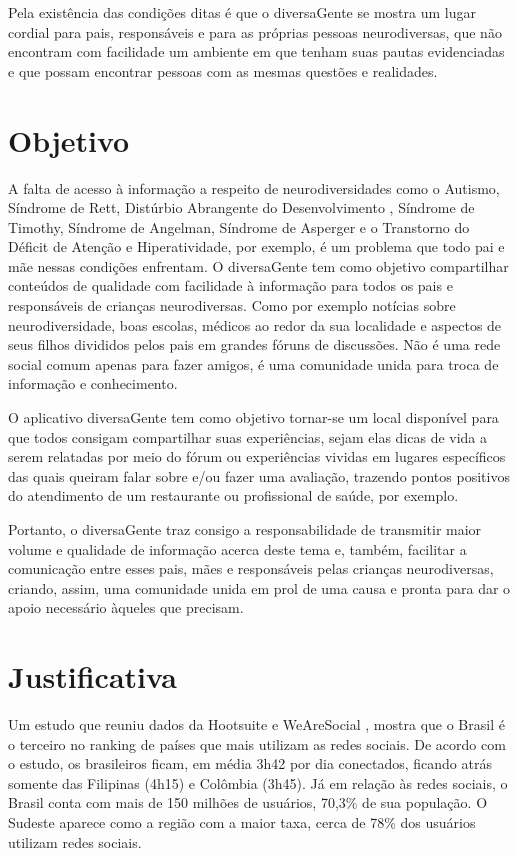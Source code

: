 Pela existência das condições ditas é que o diversaGente se mostra um lugar cordial para pais, responsáveis e para as próprias pessoas neurodiversas, que não encontram com facilidade um ambiente em que tenham suas pautas evidenciadas e que possam encontrar pessoas com as mesmas questões e realidades.

\section{Objetivo}

A falta de acesso à informação a respeito de neurodiversidades como o Autismo, Síndrome de Rett, Distúrbio Abrangente do Desenvolvimento , Síndrome de Timothy, Síndrome de Angelman, Síndrome de Asperger e o Transtorno do Déficit de Atenção e Hiperatividade, por exemplo, é um problema que todo pai e mãe nessas condições enfrentam. O diversaGente tem como objetivo compartilhar conteúdos de qualidade com facilidade à informação para todos os pais e responsáveis de crianças neurodiversas. Como por exemplo notícias sobre neurodiversidade, boas escolas, médicos ao redor da sua localidade e aspectos de seus filhos divididos pelos pais em grandes fóruns de discussões. Não é uma rede social comum apenas para fazer amigos, é uma comunidade unida para troca de informação e conhecimento.


O aplicativo diversaGente tem como objetivo tornar-se um local disponível para que todos consigam compartilhar suas experiências, sejam elas dicas de vida a serem relatadas por meio do fórum ou experiências vividas em lugares específicos das quais queiram falar sobre e/ou fazer uma avaliação, trazendo pontos positivos do atendimento de um restaurante ou profissional de saúde, por exemplo.

Portanto, o diversaGente traz consigo a responsabilidade de transmitir maior volume e qualidade de informação acerca deste tema e, também, facilitar a comunicação entre esses pais, mães e responsáveis pelas crianças neurodiversas, criando, assim, uma comunidade unida em prol de uma causa e pronta para dar o apoio necessário àqueles que precisam.

\section{Justificativa}

Um estudo que reuniu dados da Hootsuite e WeAreSocial \cite{metropoles}, mostra que o Brasil é o terceiro no ranking de países que mais utilizam as redes sociais. De acordo com o estudo, os brasileiros ficam, em média 3h42 por dia conectados, ficando atrás somente das Filipinas (4h15) e Colômbia (3h45).
Já em relação às redes sociais, o Brasil conta com mais de 150 milhões de usuários, 70,3\% de sua população. O Sudeste aparece como a região com a maior taxa, cerca de 78\% dos usuários utilizam redes sociais.

